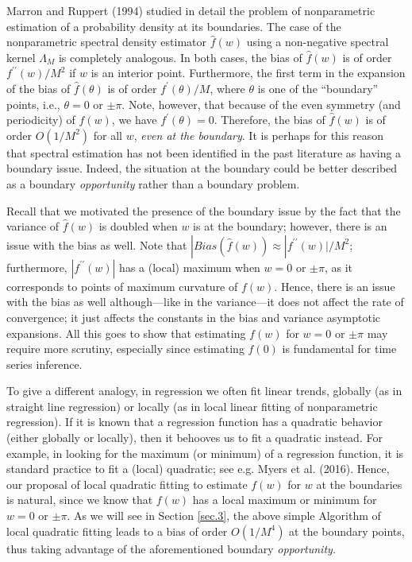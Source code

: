 \documentclass[12p E.Lt,psfig]{article} %
\begin{document}
\begin{Remark} \rm  
Marron  and Ruppert  (1994) 
 studied in detail the problem of nonparametric   estimation of a probability density 
  at its boundaries.   The case of the nonparametric  spectral density estimator 
  $ \widehat{ f}  (w)$ using a non-negative spectral kernel   $\Lambda_M$ is completely analogous. 
  In both cases, the bias of $ \widehat{ f}  (w)$ is of order $f^{\prime \prime } (w)/M^2$ if 
  $w$ is an interior point. Furthermore, the first term in the expansion of 
  the bias of $ \widehat{ f}  (\theta)$ is of order 
      $f^{\prime   } (\theta)/M$,  where $\theta$ is one of the
  ``boundary''  points, i.e., $\theta =0$ or $\pm \pi$.  
  Note, however, that because of the even symmetry (and periodicity) of $f(w) $, we have
$f^\prime (\theta)=0$. Therefore, the bias of $ \widehat{ f}  (w)$ is of order $O(1/M^2)$ 
for all $w$, {\it even at the boundary}. It is perhaps for this reason that spectral   estimation has not been identified in the past literature as having a boundary issue. 
 Indeed, the situation at the
boundary could be better described as a boundary {\it opportunity} rather than a boundary problem.  
 
Recall that we motivated the presence of the boundary issue by the fact that
the variance of  $ \widehat{ f}  (w)$ is doubled when  $w$ is at the boundary;
however,  there is an issue with the bias as well. Note that 
$|Bias ( \widehat{ f}  (w)) \approx |f^{\prime \prime } (w)|/M^2$;
furthermore, $ |f^{\prime \prime } (w)|$ has a (local) maximum when
$w =0$ or $\pm \pi$, as it corresponds to   points of maximum curvature 
of $f(w)$.  Hence, there is an issue with the bias as well although---like 
in the variance---it does not affect the rate of convergence; it just affects the
constants in the bias and variance asymptotic expansions. 
All this goes to show that estimating $  { f}  (w)$ for $w =0$ or $\pm \pi$
may require more scrutiny, especially since estimating $  { f}  (0)$ is  
fundamental  for time series inference.  

To give a different analogy, in regression we often fit linear trends, globally
(as in straight line regression) or locally (as in local linear fitting of nonparametric
regression). If it is known that a regression function has a quadratic behavior
(either globally or locally), then it behooves us to fit a quadratic instead.
For example, in looking for the maximum (or minimum) of a regression function,
it is standard practice to fit a (local) quadratic; see e.g. Myers et al. (2016).  
Hence, our proposal of local quadratic fitting to estimate $  { f}  (w)$ for $w  $ 
at the boundaries is   natural, since we know that   $  { f}  (w)$ 
has a local maximum or minimum  for $w    =0$ or $\pm \pi$.  
 As we will see in Section \ref{sec.3}, the above simple Algorithm 
of local quadratic fitting    leads to a bias of   
order $O(1/M^4)$ at the boundary points, thus 
  taking advantage of  the aforementioned   boundary {\it opportunity.}

\end{Remark} 
\end{document}
